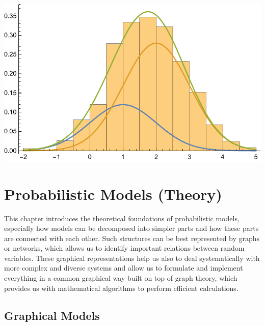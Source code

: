 \documentclass{tstextbook}
\begin{document}
\begin{example}
 \includegraphics[scale=0.9, center]{images/gaussian_mixture_model_sampling.pdf}
\end{example}

\chapter{Probabilistic Models (Theory)}

\begin{summary}
  This chapter introduces the theoretical foundations of probabilistic models, especially how models can be decomposed into simpler parts and how these parts are connected with each other. Such structures can be best represented by graphs or networks, which allows us to identify important relations between random variables. These graphical representations help us also to deal systematically with more complex and diverse systems and allow us to formulate and implement everything in a common graphical way built on top of graph theory, which provides us with mathematical algorithms to perform efficient calculations.
\end{summary}

\section{Graphical Models}
\end{document}
